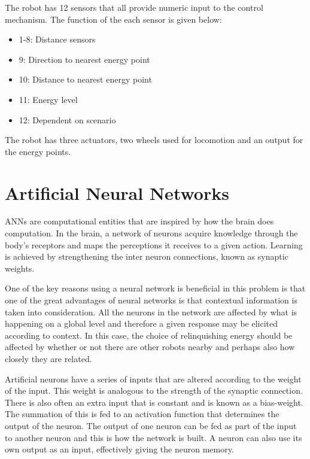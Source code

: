 \documentclass[a4paper]{book}
\begin{document}
The robot has 12 sensors that all provide numeric input to the control mechanism. 
The function of the each sensor is given below:

\begin{itemize}
\item{1-8: Distance sensors}
\item{9: Direction to nearest energy point}
\item{10: Distance to nearest energy point}
\item{11: Energy level}
\item{12: Dependent on scenario}
\end{itemize}

The robot has three actuators, two wheels used for locomotion and an output for the energy points.


 
\section{Artificial Neural Networks}


ANNs are computational entities that are inspired by how the brain does computation. 
In the brain, a network of neurons acquire knowledge through the body's receptors and maps the perceptions it receives to a given action. 
Learning is achieved by strengthening the inter neuron connections, known as synaptic weights. \cite{haykin_neural_1994} 

One of the key reasons using a neural network is beneficial in this problem is that one of the great advantages of neural networks is that contextual information is taken into consideration. 
All the neurons in the network are affected by what is happening on a global level and therefore a given response may be elicited according to context.
In this case, the choice of relinquishing energy should be affected by whether or not there are other robots nearby and perhaps also how closely they are related.

Artificial neurons have a series of inputs that are altered according to the weight of the input. This weight is analogous to the strength of the synaptic connection.
There is also often an extra input that is constant and is known as a bias-weight. The summation of this is fed to an activation function that determines the output of the neuron. The output of one neuron can be fed as part of the input to another neuron and this is how the network is built. A neuron can also use its own output as an input, effectively giving the neuron memory. 
\end{document}
